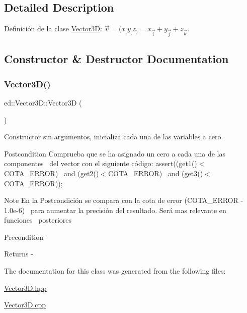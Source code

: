 \subsection{Detailed Description}
Definición de la clase \mbox{\hyperlink{classed_1_1Vector3D}{Vector3D}}\+: $ \vec{v} = (x_, y_, z_) = x_ \vec{i} + y_ \vec{j} + z_ \vec{k} $. 

\subsection{Constructor \& Destructor Documentation}
\mbox{\label{classed_1_1Vector3D_a6747bbbfd5d1fac542e46315aed209e5}} 
\subsubsection{\texorpdfstring{Vector3\+D()}{Vector3D()}}
{\footnotesize\ttfamily ed\+::\+Vector3\+D\+::\+Vector3D (\begin{DoxyParamCaption}{ }\end{DoxyParamCaption})}



Constructor sin argumentos, inicializa cada una de las variables a cero. 

\begin{DoxyPostcond}{Postcondition}
Comprueba que se ha asignado un cero a cada una de las componentes~\newline
 del vector con el siguiente código\+: assert((get1()$<$C\+O\+T\+A\+\_\+\+E\+R\+R\+OR)~\newline
 and (get2()$<$C\+O\+T\+A\+\_\+\+E\+R\+R\+OR)~\newline
 and (get3()$<$C\+O\+T\+A\+\_\+\+E\+R\+R\+OR));
\end{DoxyPostcond}
\begin{DoxyNote}{Note}
En la Postcondición se compara con la cota de error (C\+O\+T\+A\+\_\+\+E\+R\+R\+OR -\/ 1.\+0e-\/6)~\newline
 para aumentar la precisión del resultado. Será mas relevante en funciones~\newline
 posteriores 
\end{DoxyNote}
\begin{DoxyPrecond}{Precondition}
-\/ 
\end{DoxyPrecond}
\begin{DoxyReturn}{Returns}
-\/ 
\end{DoxyReturn}


The documentation for this class was generated from the following files\+:\begin{DoxyCompactItemize}
\item 
\mbox{\hyperlink{Vector3D_8hpp}{Vector3\+D.\+hpp}}\item 
\mbox{\hyperlink{Vector3D_8cpp}{Vector3\+D.\+cpp}}\end{DoxyCompactItemize}
